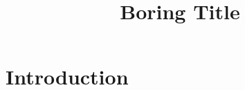 \documentclass[aspectratio=169]{beamer}
\title{Boring Title}
\begin{document}
\begin{frame}
  \titlepage
\end{frame}

\section{Introduction}
\begin{frame}
  \lipsum[1]
\end{frame}
\end{document}
